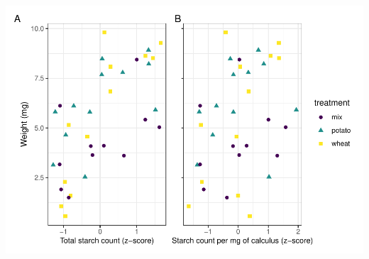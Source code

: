 \documentclass[utf8]{frontiers/frontiersSCNS}
\let\origfigure\figure
\let\endorigfigure\endfigure
\renewenvironment{figure}[1][2] {
    \expandafter\origfigure\expandafter[H]
} {
    \endorigfigure
}
\begin{document}
\begin{figure}[H]

{\centering \includegraphics{../figures/cor-plot-1} 

}

\caption{Scatter plots of (A) sample weight in mg and standardised starch count by z-score for separated treatments, and (B) sample weight in mg and standardised count of starch grains per mg calculus.}\label{fig:cor-plot}
\end{figure}
\end{document}
